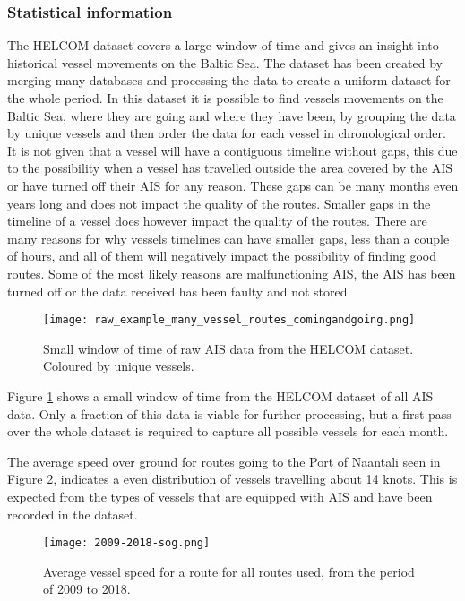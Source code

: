\documentclass[../main.tex]{subfiles}
\begin{document}
\subsubsection{Statistical information}
\label{sec:AIS-stat}
The HELCOM dataset covers a large window of time and gives an insight into historical vessel movements on the Baltic Sea. The dataset has been created by merging many databases and processing the data to create a uniform dataset for the whole period. In this dataset it is possible to find vessels movements on the Baltic Sea, where they are going and where they have been, by grouping the data by unique vessels and then order the data for each vessel in chronological order. It is not given that a vessel will have a contiguous timeline without gaps, this due to the possibility when a vessel has travelled outside the area covered by the AIS or have turned off their AIS for any reason. These gaps can be many months even years long and does not impact the quality of the routes. Smaller gaps in the timeline of a vessel does however impact the quality of the routes. There are many reasons for why vessels timelines can have smaller gaps, less than a couple of hours, and all of them will negatively impact the possibility of finding good routes. Some of the most likely reasons are malfunctioning AIS, the AIS has been turned off or the data received has been faulty and not stored.

\begin{figure}[H]
	\centering
	\texttt{[image: raw\_example\_many\_vessel\_routes\_comingandgoing.png]}
	\caption{Small window of time of raw AIS data from the HELCOM dataset. Coloured by unique vessels.}
	\label{fig:raw-ais-data}
\end{figure}

Figure \ref{fig:raw-ais-data} shows a small window of time from the HELCOM dataset of all AIS data. Only a fraction of this data is viable for further processing, but a first pass over the whole dataset is required to capture all possible vessels for each month.

The average speed over ground for routes going to the Port of Naantali seen in Figure \ref{fig:sog-dist}, indicates a even distribution of vessels travelling about 14 knots. This is expected from the types of vessels that are equipped with AIS and have been recorded in the dataset.

\begin{figure}[H]
	\centering
	\texttt{[image: 2009-2018-sog.png]}
	\caption{Average vessel speed for a route for all routes used, from the period of 2009 to 2018.}
	\label{fig:sog-dist}
\end{figure}
\end{document}

